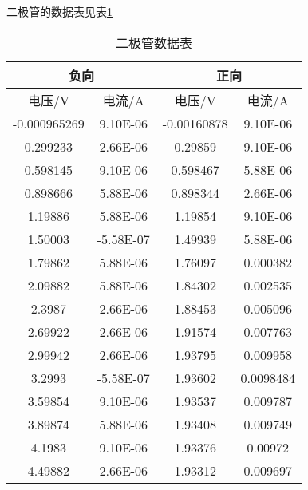 \documentclass[11pt]{article}
\begin{document}
	二极管的数据表见表\ref{tab:二极管表}
	\begin{table}[h!]
		\centering
		\begin{tabular}{|cc|cc|}
			\hline
			\multicolumn{2}{|c|}{负向}                   & \multicolumn{2}{c|}{正向}                   \\ \hline
			\multicolumn{1}{|c|}{电压/V}     & 电流/A      & \multicolumn{1}{c|}{电压/V}     & 电流/A      \\ \hline
			\multicolumn{1}{|c|}{-0.000965269} & 9.10E-06 & \multicolumn{1}{c|}{-0.00160878} & 9.10E-06 \\ \hline
			\multicolumn{1}{|c|}{0.299233} & 2.66E-06  & \multicolumn{1}{c|}{0.29859}  & 9.10E-06  \\ \hline
			\multicolumn{1}{|c|}{0.598145} & 9.10E-06  & \multicolumn{1}{c|}{0.598467} & 5.88E-06  \\ \hline
			\multicolumn{1}{|c|}{0.898666} & 5.88E-06  & \multicolumn{1}{c|}{0.898344} & 2.66E-06  \\ \hline
			\multicolumn{1}{|c|}{1.19886}  & 5.88E-06  & \multicolumn{1}{c|}{1.19854}  & 9.10E-06  \\ \hline
			\multicolumn{1}{|c|}{1.50003}  & -5.58E-07 & \multicolumn{1}{c|}{1.49939}  & 5.88E-06  \\ \hline
			\multicolumn{1}{|c|}{1.79862}  & 5.88E-06  & \multicolumn{1}{c|}{1.76097}  & 0.000382  \\ \hline
			\multicolumn{1}{|c|}{2.09882}  & 5.88E-06  & \multicolumn{1}{c|}{1.84302}  & 0.002535  \\ \hline
			\multicolumn{1}{|c|}{2.3987}   & 2.66E-06  & \multicolumn{1}{c|}{1.88453}  & 0.005096  \\ \hline
			\multicolumn{1}{|c|}{2.69922}  & 2.66E-06  & \multicolumn{1}{c|}{1.91574}  & 0.007763  \\ \hline
			\multicolumn{1}{|c|}{2.99942}  & 2.66E-06  & \multicolumn{1}{c|}{1.93795}  & 0.009958  \\ \hline
			\multicolumn{1}{|c|}{3.2993}   & -5.58E-07 & \multicolumn{1}{c|}{1.93602}  & 0.0098484 \\ \hline
			\multicolumn{1}{|c|}{3.59854}  & 9.10E-06  & \multicolumn{1}{c|}{1.93537}  & 0.009787  \\ \hline
			\multicolumn{1}{|c|}{3.89874}  & 5.88E-06  & \multicolumn{1}{c|}{1.93408}  & 0.009749  \\ \hline
			\multicolumn{1}{|c|}{4.1983}   & 9.10E-06  & \multicolumn{1}{c|}{1.93376}  & 0.00972   \\ \hline
			\multicolumn{1}{|c|}{4.49882}  & 2.66E-06  & \multicolumn{1}{c|}{1.93312}  & 0.009697  \\ \hline
		\end{tabular}
		\caption{二极管数据表}
		\label{tab:二极管表}
	\end{table}
	
\end{document}
